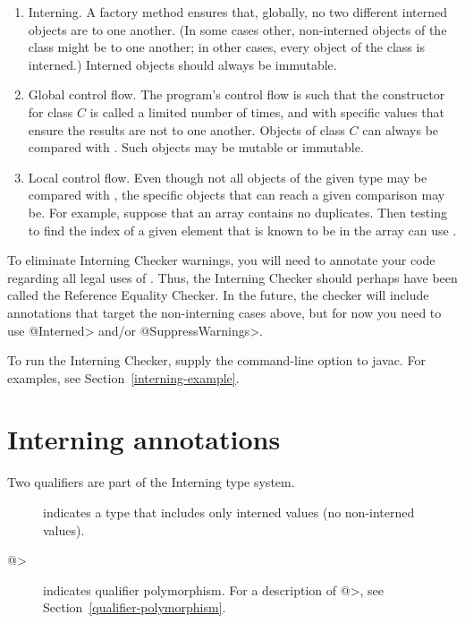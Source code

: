\begin{enumerate}
\item
  Interning.  A factory method ensures that, globally, no two different
  interned objects are  to one another.  (In some cases
  other, non-interned objects of the class might be  to one
  another; in other cases, every object of the class is interned.)
  Interned objects should always be immutable.
\item
  Global control flow.  The program's control flow is such that the
  constructor for class $C$ is called a limited number of times, and with
  specific values that ensure the results are not  to one
  another.  Objects of class $C$ can always be compared with \code{==}.
  Such objects may be mutable or immutable.
\item
  Local control flow.  Even though not all objects of the given type may be
  compared with \code{==}, the specific objects that can reach a given
  comparison may be.  For example, suppose that an array contains no
  duplicates.  Then testing to find the index of a given element that is
  known to be in the array can use \code{==}.
\end{enumerate}

To eliminate Interning Checker warnings, you will need to annotate your
code regarding all legal uses of \code{==}.  Thus, the Interning Checker
should perhaps have been called the Reference Equality Checker.  In the
future, the checker will include annotations that target the non-interning
cases above, but for now you need to use \<@Interned> and/or
\<@SuppressWarnings>.

To run the Interning Checker, supply the  command-line option to javac.  For
examples, see Section~\ref{interning-example}.


\section{Interning annotations\label{interning-annotations}}

Two qualifiers are part of the Interning type system.

\begin{description}

\item[]
  indicates a type that includes only interned values (no non-interned
  values).

\item[\<@>]
  indicates qualifier polymorphism.  For a description of
  \<@>, see
  Section~\ref{qualifier-polymorphism}.

\end{description}


